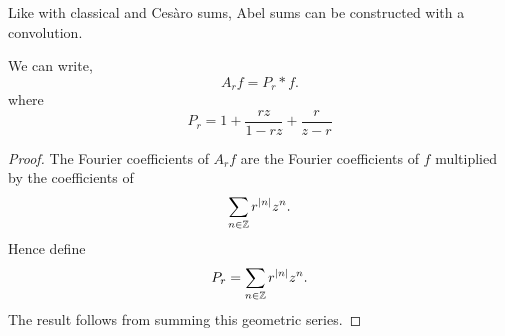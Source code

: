 Like with classical and Ces\`aro sums, Abel sums can be constructed with a convolution.
\begin{proposition}
    We can write,
    \begin{equation*}
        A_r f = P_r * f.
    \end{equation*}
    where
    \begin{equation*}
        P_r = 1+\frac{rz}{1-rz} + \frac{r}{z-r}
    \end{equation*}
\end{proposition}
\begin{proof}
    The Fourier coefficients of $A_r f$ are the Fourier coefficients of
    $f$ multiplied by the coefficients of
    \begin{equation*}
        \sum_{n \in \mathbb{Z}} r^{|n|} z^n.
    \end{equation*}
    Hence define
    \begin{equation*}
        P_r = \sum_{n \in \mathbb{Z}} r^{|n|} z^n.
    \end{equation*}
    The result follows from summing this geometric series.
\end{proof}


